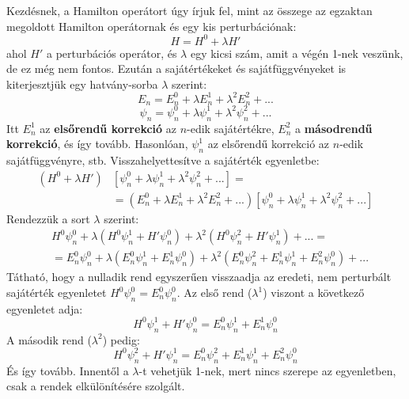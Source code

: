 \documentclass[../main.tex]{subfiles}
\begin{document}
Kezdésnek, a Hamilton operátort úgy írjuk fel, mint az összege az egzaktan megoldott Hamilton operátornak és egy kis perturbációnak:
\begin{equation}
    H = H^0 + \lambda H'
\end{equation}
ahol $H'$ a perturbációs operátor, és $\lambda$ egy kicsi szám, amit a végén 1-nek veszünk, de ez még nem fontos. Ezután a sajátértékeket és sajátfüggvényeket is kiterjesztjük egy hatvány-sorba $\lambda$ szerint:
\begin{equation}
    E_n = E_n^0 + \lambda E_n^1 + \lambda^2 E_n^2 + ...
\end{equation}
\begin{equation}
    \psi_n = \psi_n^0 + \lambda \psi_n^1 + \lambda^2 \psi_n^2 + ...
\end{equation}
Itt $E_n^1$ az \textbf{elsőrendű korrekció} az $n$-edik sajátértékre, $E_n^2$ a \textbf{másodrendű korrekció}, és így tovább. Hasonlóan, $\psi_n^1$ az elsőrendű korrekció az $n$-edik sajátfüggvényre, stb.
Visszahelyettesítve a sajátérték egyenletbe:
\begin{equation}
    \begin{aligned}
        (H^0 + \lambda H') &\left[\psi_n^0 + \lambda \psi_n^1 + \lambda^2 \psi_n^2 + ...\right] = \\
        &= (E_n^0 + \lambda E_n^1 + \lambda^2 E_n^2 + ...) \left[\psi_n^0 + \lambda \psi_n^1 + \lambda^2 \psi_n^2 + ...\right]
    \end{aligned}
\end{equation}
Rendezzük a sort $\lambda$ szerint:
\begin{equation}
    \begin{aligned}
        &H^0 \psi_n^0 + \lambda \left( H^0 \psi_n^1 + H' \psi_n^0 \right) + \lambda^2 \left( H^0 \psi_n^2 + H' \psi_n^1 \right) + ... = \\
        &= E_n^0 \psi_n^0 + \lambda \left( E_n^0 \psi_n^1 + E_n^1 \psi_n^0 \right) + \lambda^2 \left( E_n^0 \psi_n^2 + E_n^1 \psi_n^1 + E_n^2 \psi_n^0 \right) + ...
    \end{aligned}
\end{equation}
Tátható, hogy a nulladik rend egyszerűen visszaadja az eredeti, nem perturbált sajátérték egyenletet $H^0 \psi_n^0 = E_n^0 \psi_n^0$.
Az első rend ($\lambda^1$) viszont a következő egyenletet adja:
\begin{equation}
    H^0 \psi_n^1 + H' \psi_n^0 = E_n^0 \psi_n^1 + E_n^1 \psi_n^0
\end{equation}
A második rend ($\lambda^2$) pedig:
\begin{equation}
    H^0 \psi_n^2 + H' \psi_n^1 = E_n^0 \psi_n^2 + E_n^1 \psi_n^1 + E_n^2 \psi_n^0
\end{equation}
És így tovább. Innentől a $\lambda$-t vehetjük 1-nek, mert nincs szerepe az egyenletben, csak a rendek elkülönítésére szolgált. 
\end{document}
